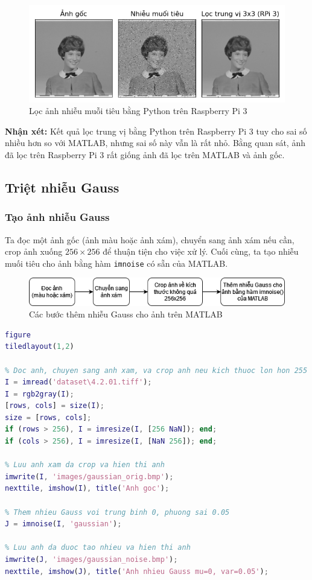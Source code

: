 \begin{figure}[H]
    \centering
    \includegraphics[width=1\linewidth]{images/salt_pepper_denoise_rpi3.png}
    \caption{Lọc ảnh nhiễu muỗi tiêu bằng Python trên Raspberry Pi 3}
    \label{fig:salt_pepper_denoise_rpi3}
\end{figure}

\textbf{Nhận xét:} Kết quả lọc trung vị bằng Python trên Raspberry Pi 3 tuy cho sai số nhiều hơn so với MATLAB, nhưng sai số này vẫn là rất nhỏ. Bằng quan sát, ảnh đã lọc trên Raspberry Pi 3 rất giống ảnh đã lọc trên MATLAB và ảnh gốc. 

\subsection{Triệt nhiễu Gauss}

\subsubsection{Tạo ảnh nhiễu Gauss}

Ta đọc một ảnh gốc (ảnh màu hoặc ảnh xám), chuyển sang ảnh xám nếu cần, crop ảnh xuống $256 \times 256$ để thuận tiện cho việc xử lý. Cuối cùng, ta tạo nhiễu muối tiêu cho ảnh bằng hàm \texttt{imnoise} có sẵn của MATLAB.

\begin{figure}[H]
    \centering
    \includegraphics[width=1\linewidth]{images/gaussian_gen_noise.png}
    \caption{Các bước thêm nhiễu Gauss cho ảnh trên MATLAB}
    \label{fig:gaussian_gen_noise}
\end{figure}

\begin{lstlisting}[language=MATLAB]
figure
tiledlayout(1,2)

% Doc anh, chuyen sang anh xam, va crop anh neu kich thuoc lon hon 255
I = imread('dataset\4.2.01.tiff');
I = rgb2gray(I);
[rows, cols] = size(I);
size = [rows, cols];
if (rows > 256), I = imresize(I, [256 NaN]); end;
if (cols > 256), I = imresize(I, [NaN 256]); end;

% Luu anh xam da crop va hien thi anh
imwrite(I, 'images/gaussian_orig.bmp');
nexttile, imshow(I), title('Anh goc');

% Them nhieu Gauss voi trung binh 0, phuong sai 0.05
J = imnoise(I, 'gaussian');

% Luu anh da duoc tao nhieu va hien thi anh
imwrite(J, 'images/gaussian_noise.bmp');
nexttile, imshow(J), title('Anh nhieu Gauss mu=0, var=0.05');
\end{lstlisting}

